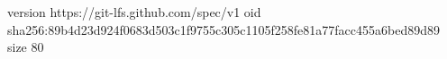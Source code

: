 version https://git-lfs.github.com/spec/v1
oid sha256:89b4d23d924f0683d503c1f9755c305c1105f258fe81a77facc455a6bed89d89
size 80
